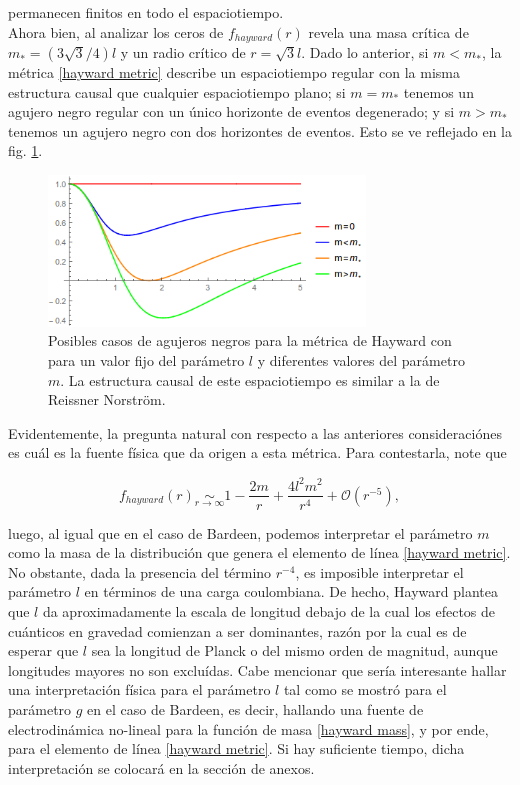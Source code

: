 \documentclass[16pt,a4paper]{article}
\numberwithin{equation}{section}
\theoremstyle{definition}
\begin{document}
permanecen finitos en todo el espaciotiempo.\\

Ahora bien, al analizar los ceros de $f_{hayward}(r)$ revela una masa crítica de $m_{*} = (3\sqrt{3}/4)l$ y un radio crítico de $r = \sqrt{3}l$. Dado lo anterior, si $m < m_{*}$, la métrica \ref{hayward metric} describe un espaciotiempo regular con la misma estructura causal que cualquier espaciotiempo plano; si $m = m_{*}$ tenemos un agujero negro regular con un único horizonte de eventos degenerado; y si $m > m_{*}$ tenemos un agujero negro con dos horizontes de eventos. Esto se ve reflejado en la fig. \ref{fig: fhayward analysis}. 

\begin{figure}[h!]
	\centering
	\includegraphics[width=0.75\textwidth]{fhaywardAnalysis}
	\caption{Posibles casos de agujeros negros para la métrica de Hayward con para un valor fijo del parámetro $l$ y diferentes valores del parámetro $m$. La estructura causal de este espaciotiempo es similar a la de Reissner Norström.}
	\label{fig: fhayward analysis}
\end{figure}

Evidentemente, la pregunta natural con respecto a las anteriores consideraciónes es cuál es la fuente física que da origen a esta métrica. Para contestarla, note que 

\begin{equation}
f_{hayward}(r) \underset{r \to \infty}{\sim} 1 - \frac{2m}{r} + \frac{4l^2m^2}{r^4} + \mathcal{O}(r^{-5}),
\end{equation}

luego, al igual que en el caso de Bardeen, podemos interpretar el parámetro $m$ como la masa de la distribución que genera el elemento de línea \eqref{hayward metric}. No obstante, dada la presencia del término $r^{-4}$, es imposible interpretar el parámetro $l$ en términos de una carga coulombiana. De hecho, Hayward plantea que $l$ da aproximadamente la escala de longitud debajo de la cual los efectos de cuánticos en gravedad comienzan a ser dominantes, razón por la cual es de esperar que $l$ sea la longitud de Planck o del mismo orden de magnitud, aunque longitudes mayores no son excluídas. Cabe mencionar que sería interesante hallar una interpretación física para el parámetro $l$ tal como se mostró para el parámetro $g$ en el caso de Bardeen, es decir, hallando una fuente de electrodinámica no-lineal para la función de masa \eqref{hayward mass}, y por ende, para el elemento de línea \eqref{hayward metric}. Si hay suficiente tiempo, dicha interpretación se colocará en la sección de anexos.\\
\end{document}
